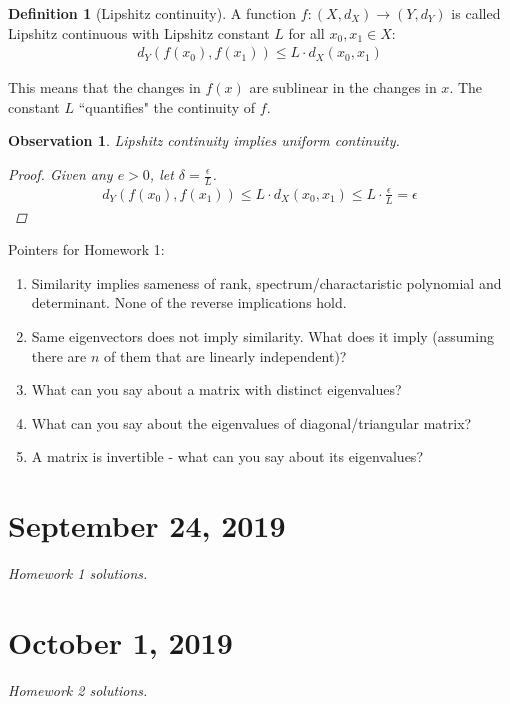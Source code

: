 \documentclass[11pt]{article}
\newcommand{\e}{\epsilon}
\theoremstyle{plain}
\newtheorem{obs}{Observation}[section]
\theoremstyle{definition}
\newtheorem{defi}{Definition}[section]
\theoremstyle{remark}
\begin{document}
\begin{defi}[Lipshitz continuity]
    A function $f: (X,d_X) \rightarrow (Y, d_Y)$ is called Lipshitz continuous with Lipshitz constant $L$ for all $x_0, x_1 \in X$:
    \begin{align*}
        d_Y(f(x_0), f(x_1)) \leq L \cdot d_X(x_0, x_1)
    \end{align*}
\end{defi}
This means that the changes in $f(x)$ are sublinear in the changes in $x$. The constant $L$ ``quantifies" the continuity of $f$. 
\begin{obs}
    Lipshitz continuity implies uniform continuity.
    \begin{proof}
        Given any $e > 0$, let $\delta = \frac{\e}{L}$.
        \begin{align*}
            d_Y(f(x_0), f(x_1)) \leq L \cdot d_X(x_0, x_1) \leq L \cdot \frac{\e}{L} = \e
        \end{align*}
    \end{proof}
\end{obs}

Pointers for Homework 1:
\begin{enumerate}
        \item Similarity implies sameness of rank, spectrum/charactaristic polynomial and determinant. None of the reverse implications hold.
        \item Same eigenvectors does not imply similarity. What does it imply (assuming there are $n$ of them that are linearly independent)?
        \item What can you say about a matrix with distinct eigenvalues?
        \item What can you say about the eigenvalues of diagonal/triangular matrix?
        \item A matrix is invertible - what can you say about its eigenvalues?
    \end{enumerate}

\section{September 24, 2019}

{\it Homework 1 solutions.}

\section{October 1, 2019}

{\it Homework 2 solutions.}
\end{document}
